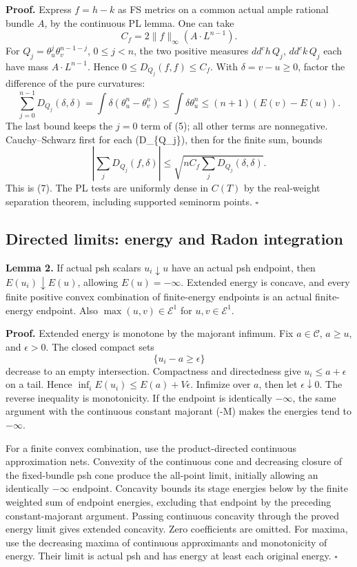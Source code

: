 \documentclass[
]{article}
\begin{document}
\textbf{Proof.} Express \(f=h-k\) as FS metrics on a common actual ample
rational bundle \(A\), by the continuous PL lemma. One can take \[
C_f=2\|f\|_\infty(A\cdot L^{n-1}).
\] For \(Q_j=\theta_u^j\theta_v^{n-1-j}\), \(0\leq j<n\), the two
positive measures \(dd^ch\,Q_j\), \(dd^ck\,Q_j\) each have mass
\(A\cdot L^{n-1}\). Hence \(0\leq D_{Q_j}(f,f)\leq C_f\). With
\(\delta=v-u\geq0\), factor the difference of the pure curvatures: \[
\sum_{j=0}^{n-1}D_{Q_j}(\delta,\delta)
=\int\delta(\theta_u^n-\theta_v^n)
\leq\int\delta\theta_u^n
\leq(n+1)(E(v)-E(u)).
\] The last bound keeps the \(j=0\) term of (5); all other terms are
nonnegative. Cauchy--Schwarz first for each (D\_\{Q\_j\}), then for the
finite sum, bounds \[
\left|\sum_jD_{Q_j}(f,\delta)\right|
\leq\sqrt{nC_f\sum_jD_{Q_j}(\delta,\delta)}.
\] This is (7). The PL tests are uniformly dense in \(C(T)\) by the
real-weight separation theorem, including supported seminorm points.
\(\square\)

\subsection{Directed limits: energy and Radon
integration}\label{directed-limits-energy-and-radon-integration}

\textbf{Lemma 2.} If actual psh scalars \(u_i\downarrow u\) have an
actual psh endpoint, then \(E(u_i)\downarrow E(u)\), allowing
\(E(u)=-\infty\). Extended energy is concave, and every finite positive
convex combination of finite-energy endpoints is an actual finite-energy
endpoint. Also \(\max(u,v)\in\mathcal E^1\) for \(u,v\in\mathcal E^1\).

\textbf{Proof.} Extended energy is monotone by the majorant infimum. Fix
\(a\in\mathcal C\), \(a\geq u\), and \(\epsilon>0\). The closed compact
sets \[
\{u_i-a\geq\epsilon\}
\] decrease to an empty intersection. Compactness and directedness give
\(u_i\leq a+\epsilon\) on a tail. Hence
\(\inf_iE(u_i)\leq E(a)+V\epsilon\). Infimize over \(a\), then let
\(\epsilon\downarrow0\). The reverse inequality is monotonicity. If the
endpoint is identically \(-\infty\), the same argument with the
continuous constant majorant (-M) makes the energies tend to
\(-\infty\).

For a finite convex combination, use the product-directed continuous
approximation nets. Convexity of the continuous cone and decreasing
closure of the fixed-bundle psh cone produce the all-point limit,
initially allowing an identically \(-\infty\) endpoint. Concavity bounds
its stage energies below by the finite weighted sum of endpoint
energies, excluding that endpoint by the preceding constant-majorant
argument. Passing continuous concavity through the proved energy limit
gives extended concavity. Zero coefficients are omitted. For maxima, use
the decreasing maxima of continuous approximants and monotonicity of
energy. Their limit is actual psh and has energy at least each original
energy. \(\square\)
\end{document}
